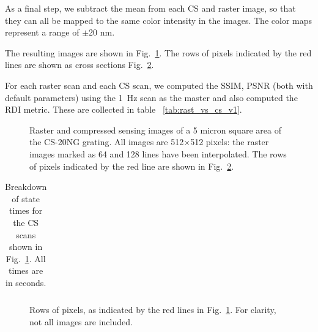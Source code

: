\documentclass[twocolumn,oneside]{IEEEtran/IEEEtran}
\begin{document}
As a final step, we subtract the mean from each CS and raster image,
so that they can all be mapped to the same color intensity in the
images. The color maps represent a range of $\pm$20 nm.


The resulting images are shown in Fig.~\ref{fig:resultsF1_images}. The
rows of pixels indicated by the red lines are shown as cross sections
Fig.~\ref{fig:pixel_rows}.

For each raster scan and each CS scan, we computed the SSIM, PSNR
(both with default parameters) using the 1~Hz scan as the master and
also computed the RDI metric. These are collected in table
~\ref{tab:rast_vs_cs_v1}.

\begin{figure}
  \centering
  
  \caption{Raster and compressed sensing images of a 5 micron square
    area of the CS-20NG grating. All images are 512$\times$512 pixels:
    the raster images marked as 64 and 128 lines have been
    interpolated. The rows of pixels indicated by the red line are
    shown in Fig.~\ref{fig:pixel_rows}.}
  \label{fig:resultsF1_images}
\end{figure}

%     

\begin{table}[t!]
  \centering
  \caption{Breakdown of state times for the CS scans shown in
    Fig.~\ref{fig:resultsF1_images}. All times are in seconds.}
  \label{tab:final_state_times}
  \begin{tabular}{ccccccc}
    
  \end{tabular}
\end{table}

\begin{figure}
  
  \caption{Rows of pixels, as indicated by the red lines in
    Fig.~\ref{fig:resultsF1_images}. For clarity, not all images are
    included.}
  \label{fig:pixel_rows}
\end{figure}
\end{document}
